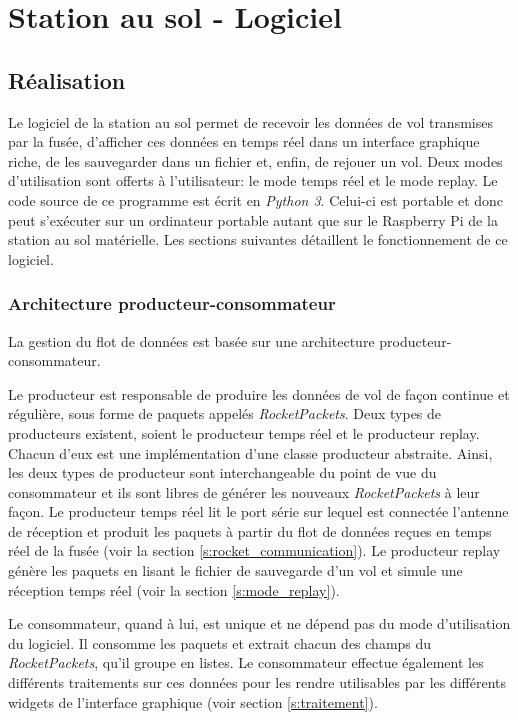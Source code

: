 \chapter{Station au sol - Logiciel}
\label{chap:sas}

\section{Réalisation}

Le logiciel de la station au sol permet de recevoir les données de vol transmises par la fusée, d'afficher ces données en temps réel dans un interface graphique riche, de les sauvegarder dans un fichier et, enfin, de rejouer un vol.
Deux modes d'utilisation sont offerts à l'utilisateur: le mode temps réel et le mode replay.
Le code source de ce programme est écrit en \textit{Python 3}.
Celui-ci est portable et donc peut s'exécuter sur un
ordinateur portable autant que sur le Raspberry Pi de la station au sol
matérielle.
Les sections suivantes détaillent le fonctionnement de ce logiciel.

\subsection{Architecture producteur-consommateur}
La gestion du flot de données est basée sur une architecture producteur-consommateur.

Le producteur est responsable de produire les données de vol de façon continue et régulière, sous forme de paquets appelés \emph{RocketPackets}.
Deux types de producteurs existent, soient le producteur temps réel et le producteur replay.
Chacun d'eux est une implémentation d'une classe producteur abstraite.
Ainsi, les deux types de producteur sont interchangeable du point de vue du consommateur et ils sont libres de générer les nouveaux \emph{RocketPackets} à leur façon.
Le producteur temps réel lit le port série sur lequel est connectée l'antenne de réception et produit les paquets à partir du flot de données reçues en temps réel de la fusée (voir la section \ref{s:rocket_communication}).
Le producteur replay génère les paquets en lisant le fichier de sauvegarde d'un vol et simule une réception temps réel (voir la section \ref{s:mode_replay}).

Le consommateur, quand à lui, est unique et ne dépend pas du mode d'utilisation du logiciel.
Il consomme les paquets et extrait chacun des champs du \emph{RocketPackets}, qu'il groupe en listes.
Le consommateur effectue également les différents traitements sur ces données pour les rendre utilisables par les différents widgets de l'interface graphique (voir section \ref{s:traitement}).

